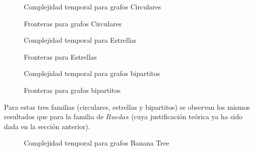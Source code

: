 \begin{figure}[H]
    \centering
    \fontsize{7}{10}\selectfont
    \resizebox{0.8\textwidth}{!}{}
    \caption{Complejidad temporal para grafos Circulares}
\end{figure}

\begin{figure}[H]
    \centering
    \fontsize{7}{10}\selectfont
    \resizebox{0.8\textwidth}{!}{}
    \caption{Fronteras para grafos Circulares}
\end{figure}

\begin{figure}[H]
    \centering
    \fontsize{7}{10}\selectfont
    \resizebox{0.8\textwidth}{!}{}
    \caption{Complejidad temporal para Estrellas}
\end{figure}

\begin{figure}[H]
    \centering
    \fontsize{7}{10}\selectfont
    \resizebox{0.8\textwidth}{!}{}
    \caption{Fronteras para Estrellas}
\end{figure}

\begin{figure}[H]
    \centering
    \fontsize{7}{10}\selectfont
    \resizebox{0.8\textwidth}{!}{}
    \caption{Complejidad temporal para grafos bipartitos}
\end{figure}

\begin{figure}[H]
    \centering
    \fontsize{7}{10}\selectfont
    \resizebox{0.8\textwidth}{!}{}
    \caption{Fronteras para grafos bipartitos}
\end{figure}

\bigskip

\par Para estas tres familias (circulares, estrellas y bipartitos) se observan los mismos
    resultados que para la familia de $Ruedas$ (cuya justificaci\'on te\'orica ya ha sido
    dada en la secci\'on anterior).

\begin{figure}[H]
    \centering
    \fontsize{7}{10}\selectfont
    \resizebox{0.8\textwidth}{!}{}
    \caption{Complejidad temporal para grafos Banana Tree}
\end{figure}

